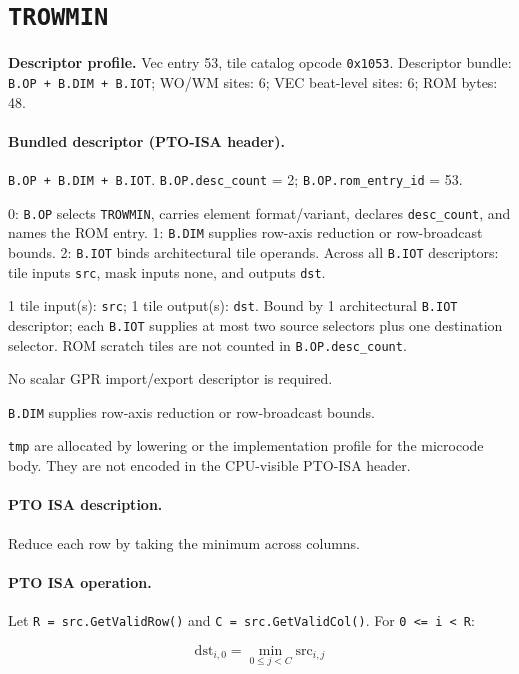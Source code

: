 \section{\texttt{TROWMIN}}
\noindent\textbf{Descriptor profile.} Vec entry 53, tile catalog opcode \texttt{0x1053}. Descriptor bundle: \texttt{B.OP + B.DIM + B.IOT}; WO/WM sites: 6; VEC beat-level sites: 6; ROM bytes: 48.\par\smallskip
{}
\paragraph{Bundled descriptor (PTO-ISA header).}
\begin{description}[leftmargin=0.18\linewidth,style=nextline]
\item[Bundle] \texttt{B.OP + B.DIM + B.IOT}. \texttt{B.OP.desc\_count} = 2; \texttt{B.OP.rom\_entry\_id} = 53.
\item[Assembly] 0: \texttt{B.OP} selects \texttt{TROWMIN}, carries element format/variant, declares \texttt{desc\_count}, and names the ROM entry. 1: \texttt{B.DIM} supplies row-axis reduction or row-broadcast bounds. 2: \texttt{B.IOT} binds architectural tile operands. Across all \texttt{B.IOT} descriptors: tile inputs \texttt{src}, mask inputs none, and outputs \texttt{dst}.
\item[Tile operands] 1 tile input(s): \texttt{src}; 1 tile output(s): \texttt{dst}. Bound by 1 architectural \texttt{B.IOT} descriptor; each \texttt{B.IOT} supplies at most two source selectors plus one destination selector. ROM scratch tiles are not counted in \texttt{B.OP.desc\_count}.
\item[Scalar GPR operands] No scalar GPR import/export descriptor is required.
\item[Metadata operands] \texttt{B.DIM} supplies row-axis reduction or row-broadcast bounds.
\item[ROM scratch operands] \texttt{tmp} are allocated by lowering or the implementation profile for the microcode body. They are not encoded in the CPU-visible PTO-ISA header.
\end{description}
\par\smallskip
{\small
\paragraph{PTO ISA description.}
Reduce each row by taking the minimum across columns.
\paragraph{PTO ISA operation.}
Let \texttt{R = src.GetValidRow()} and \texttt{C = src.GetValidCol()}. For \texttt{0 \textless{}= i \textless{} R}:

\[
\mathrm{dst}_{i,0} = \min_{0 \le j < C} \mathrm{src}_{i,j}
\]
}\par\smallskip
